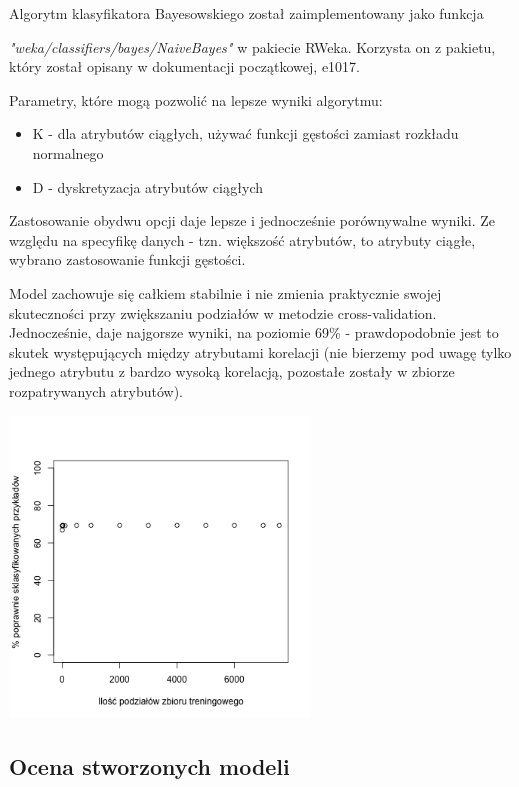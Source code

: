 \documentclass[11pt]{article} %
\begin{document}
Algorytm klasyfikatora Bayesowskiego został zaimplementowany jako funkcja

  \emph{"weka/classifiers/bayes/NaiveBayes"} w pakiecie RWeka. Korzysta on z pakietu, który został opisany w dokumentacji początkowej, e1017.

Parametry, które mogą pozwolić na lepsze wyniki algorytmu:
\begin{itemize}
\item K - dla atrybutów ciągłych, używać funkcji gęstości zamiast rozkładu normalnego
\item D - dyskretyzacja atrybutów ciągłych
\end{itemize}

Zastosowanie obydwu opcji daje lepsze i jednocześnie porównywalne wyniki. Ze względu na specyfikę danych - tzn. większość atrybutów, to atrybuty ciągłe, wybrano zastosowanie funkcji gęstości.

Model zachowuje się całkiem stabilnie i nie zmienia praktycznie swojej skuteczności przy zwiększaniu podziałów w metodzie cross-validation. Jednocześnie, daje najgorsze wyniki, na poziomie 69\% - prawdopodobnie jest to skutek występujących między atrybutami korelacji (nie bierzemy pod uwagę tylko jednego atrybutu z bardzo wysoką korelacją, pozostałe zostały w zbiorze rozpatrywanych atrybutów).

\begin{center}
	\includegraphics[height=8cm]{nb-cv}
\end{center}

\subsection{Ocena stworzonych modeli}
\end{document}
